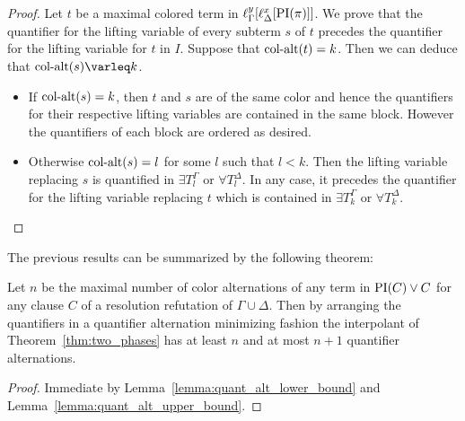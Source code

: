 \begin{proof}
	Let $t$ be a maximal colored term in $\ell_{\Gamma}^{y}[\ell_{\Delta}^{x}[\operatorname{PI}(\pi)]]$. 
	We prove that the quantifier for the lifting variable of every subterm $s$ of $t$ precedes the quantifier for the lifting variable for $t$ in $I$.
	Suppose that $\operatorname{col-alt}(t) = k$. Then we can deduce that $\ca(s) \varleq\nolinebreak{} k$.
	\begin{itemize}
		\item
			If $\operatorname{col-alt}(s) = k$, then $t$ and $s$ are of the same color and hence the quantifiers for their respective lifting variables are contained in the same block. 
			However the quantifiers of each block are ordered as desired.
		\item
			Otherwise $\operatorname{col-alt}(s) = l$ for some $l$ such that $l < k$.
			Then the lifting variable replacing $s$ is quantified in
			$\exists T_{l}^\Gamma$ or
			$\forall T_{l}^\Delta$.
			In any case, it precedes the quantifier for the lifting variable replacing $t$ which is contained in 
			$\exists T_{k}^\Gamma$ or
			$\forall T_{k}^\Delta$.
			\qedhere
	\end{itemize}
\end{proof}

The previous results can be summarized by the following theorem:\nopagebreak

\begin{thm}
	Let $n$ be the maximal number of color alternations of any term in $\operatorname{PI}(C) \lor C$ for any clause $C$ of a resolution refutation of $\Gamma \cup \Delta$.
	Then by arranging the quantifiers in a quantifier alternation minimizing fashion the interpolant of Theorem~\ref{thm:two_phases} has at least $n$ and at most $n+1$ quantifier alternations.
\end{thm}
\begin{proof}
	Immediate by Lemma~\ref{lemma:quant_alt_lower_bound} and Lemma~\ref{lemma:quant_alt_upper_bound}.
\end{proof}



